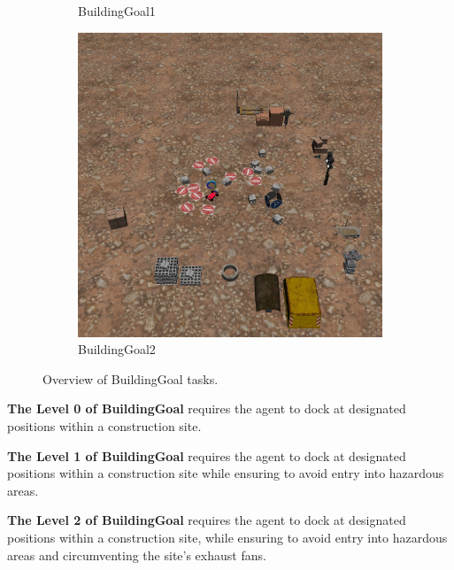 \documentclass{article}
\begin{document}
\begin{figure}[H]
\begin{subfigure}{0.3\linewidth}
        \caption{BuildingGoal1}
      \end{subfigure}
      \begin{subfigure}{0.3\linewidth}
        \centering
        \includegraphics[width=\linewidth]{assets/appendix/building_goal2.pdf}
        \caption{BuildingGoal2}
      \end{subfigure}
      \caption{Overview of BuildingGoal tasks.}
\end{figure}

\textbf{The Level 0 of BuildingGoal} requires the agent to dock at designated positions within a construction site.

\textbf{The Level 1 of BuildingGoal} requires the agent to dock at designated positions within a construction site while ensuring to avoid entry into hazardous areas.

\textbf{The Level 2 of BuildingGoal} requires the agent to dock at designated positions within a construction site, 
while ensuring to avoid entry into hazardous areas and circumventing the site’s exhaust fans.
\end{document}
